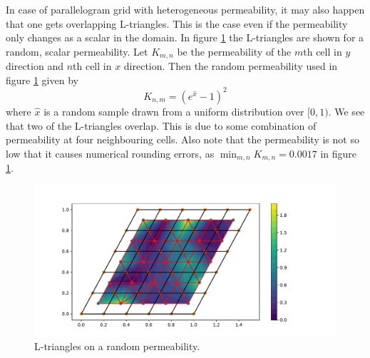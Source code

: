 \documentclass[../Main/main.tex]{subfiles}
\begin{document}
	In case of parallelogram grid with heterogeneous permeability, it may also happen that one gets overlapping L-triangles. This is the case even if the permeability only changes as a scalar in the domain. In figure \ref{fig:L-triangles-heterogeneous} the L-triangles are shown for a random, scalar permeability. Let $K_{m,n}$ be the permeability of the $m$th cell in $y$ direction and $n$th cell in $x$ direction. Then the random permeability used in figure \ref{fig:L-triangles-heterogeneous} given by
	\begin{equation}
		K_{n,m} = (e^{\hat{x}}-1)^2
	\end{equation}
	where $\hat{x}$ is a random sample drawn from a uniform distribution over $[0,1)$. We see that two of the L-triangles overlap. This is due to some combination of permeability at four neighbouring cells. Also note that the permeability is not so low that it causes numerical rounding errors, as $\min_{m,n}K_{m,n}=0.0017$ in figure \ref{fig:L-triangles-heterogeneous}.
	\begin{figure}[H]
		\centering
		\includegraphics[width=1.1\textwidth]{L-triangles-heterogenous.pdf}
		\caption{L-triangles on a random permeability.}
		\label{fig:L-triangles-heterogeneous}
	\end{figure}
\end{document}
